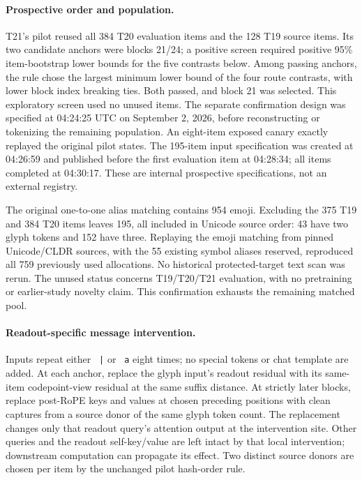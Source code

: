 \documentclass{article}
\begin{document}
\paragraph{Prospective order and population.}
T21's pilot reused all 384 T20 evaluation items and the 128 T19 source items.
Its two candidate anchors were blocks 21/24; a positive screen required
positive 95\% item-bootstrap lower bounds for the five contrasts below.
Among passing anchors, the rule chose the largest minimum lower bound of
the four route contrasts, with lower block index breaking ties. Both passed,
and block 21 was selected. This exploratory screen used no unused items.
The separate confirmation design was specified at 04:24:25 UTC on September
2, 2026, before reconstructing or tokenizing the remaining population. An
eight-item exposed canary exactly replayed the original pilot states. The
195-item input specification was created at 04:26:59 and published before
the first evaluation item at 04:28:34; all items completed at 04:30:17.
These are internal prospective specifications, not an external registry.

The original one-to-one alias matching contains 954 emoji. Excluding the
375 T19 and 384 T20 items leaves 195, all included in Unicode source order:
43 have two glyph tokens and 152 have three. Replaying the emoji matching
from pinned Unicode/CLDR sources, with the 55 existing symbol aliases
reserved, reproduced all 759 previously used allocations. No historical
protected-target text scan was rerun. The unused status concerns T19/T20/T21
evaluation, with no pretraining or earlier-study novelty claim. This
confirmation exhausts the remaining matched pool.

\paragraph{Readout-specific message intervention.}
Inputs repeat either \texttt{ |} or \texttt{ a} eight times; no special tokens
or chat template are added. At each anchor, replace the glyph input's
readout residual with its same-item codepoint-view residual at the same
suffix distance. At strictly later blocks, replace post-RoPE keys and values
at chosen preceding positions with clean captures from a source donor of
the same glyph token count. The replacement changes only that readout
query's attention output at the intervention site. Other queries and the
readout self-key/value are left intact by that local intervention;
downstream computation can propagate its effect. Two distinct source
donors are chosen per item by the unchanged pilot hash-order rule.
\end{document}
